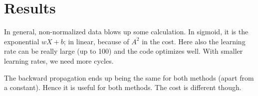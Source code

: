 \section{Results}
In general, non-normalized data blows up some calculation.
In sigmoid, it is the exponential $wX+b$; in linear, because of $A^2$ in the cost. Here also the learning rate can be really large (up to 100) and the code optimizes well. With smaller learning rates, we need more cycles.

The backward propagation ends up being the same for both methods (apart from a constant). Hence it is useful for both methods. The cost is different though.

